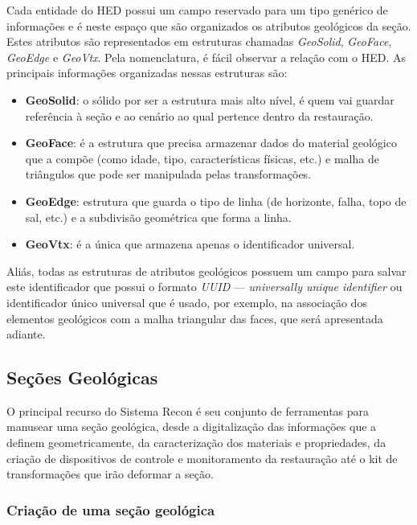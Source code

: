Cada entidade do HED possui um campo reservado para um tipo genérico de informações e é neste espaço que são organizados os atributos geológicos da seção. Estes atributos são representados em estruturas chamadas \textit{GeoSolid}, \textit{GeoFace}, \textit{GeoEdge} e \textit{GeoVtx}. Pela nomenclatura, é fácil observar a relação com o HED. As principais informações organizadas nessas estruturas são:

\renewcommand{\labelitemi}{•}
\begin{itemize}
  \item \textbf{GeoSolid}: o sólido por ser a estrutura mais alto nível, é quem vai guardar referência à seção e ao cenário ao qual pertence dentro da restauração.
  \item \textbf{GeoFace}: é a estrutura que precisa armazenar dados do material geológico que a compõe (como idade, tipo, características físicas, etc.) e malha de triângulos que pode ser manipulada pelas transformações.
  \item \textbf{GeoEdge}: estrutura que guarda o tipo de linha (de horizonte, falha, topo de sal, etc.) e a subdivisão geométrica que forma a linha. 
  \item \textbf{GeoVtx}: é a única que armazena apenas o identificador universal.
\end{itemize}

Aliás, todas as estruturas de atributos geológicos possuem um campo para salvar este identificador que possui o formato \textit{UUID} --- \textit{universally unique identifier} ou identificador único universal que é usado, por exemplo, na associação dos elementos geológicos com a malha triangular das faces, que será apresentada adiante.\cite{UUID}

\subsection{Seções Geológicas} %

O principal recurso do Sistema Recon é seu conjunto de ferramentas para manusear uma seção geológica, desde a digitalização das informações que a definem geometricamente, da caracterização dos materiais e propriedades, da criação de dispositivos de controle e monitoramento da restauração até o kit de transformações que irão deformar a seção.

\subsubsection{Criação de uma seção geológica}

